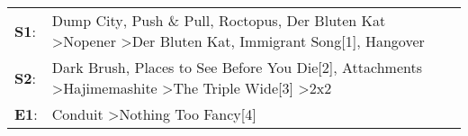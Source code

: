 \begin{supertabular}{p{0.03\textwidth}p{0.92\textwidth}}
 \textbf{S1}:  &  Dump City\textsuperscript{}, \enspace Push \& Pull\textsuperscript{}, \enspace Roctopus\textsuperscript{}, \enspace Der Bluten Kat\textsuperscript{} \textgreater \enspace Nopener\textsuperscript{} \textgreater \enspace Der Bluten Kat\textsuperscript{}, \enspace Immigrant Song[1]\textsuperscript{}, \enspace Hangover\textsuperscript{}  \enspace  \\
 \textbf{S2}:  &                                              Dark Brush\textsuperscript{},  Places to See Before You Die[2]\textsuperscript{}, \enspace Attachments\textsuperscript{} \textgreater \enspace Hajimemashite\textsuperscript{} \textgreater \enspace The Triple Wide[3]\textsuperscript{} \textgreater \enspace 2x2\textsuperscript{}  \enspace  \\
 \textbf{E1}:  &                                                                                                                                                                                                                                                          Conduit\textsuperscript{} \textgreater \enspace Nothing Too Fancy[4]\textsuperscript{}  \enspace  \\
\end{supertabular}
